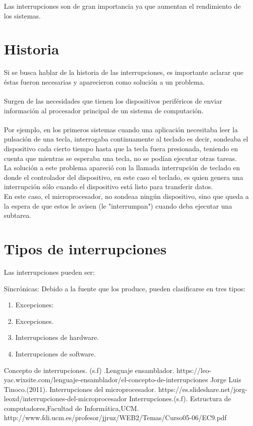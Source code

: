 \documentclass{report}   %
\begin{document}
Las interrupciones son de gran importancia ya que aumentan el rendimiento de los sistemas. 

\section*{Historia}
Si se busca hablar de la historia de las interrupciones, es importante aclarar que éstas fueron necesarias y aparecieron como solución a un problema.\\\\
Surgen de las necesidades que tienen los dispositivos periféricos de enviar información al procesador principal de un sistema de computación.\\\\ Por ejemplo, en los primeros sistemas cuando una aplicación necesitaba leer la pulsación de una tecla, interrogaba continuamente al teclado es decir, sondeaba el dispositivo cada cierto tiempo hasta que la tecla fuera presionada, teniendo en cuenta que mientras se esperaba una tecla, no se podían ejecutar otras tareas.\\ La solución a este problema apareció con la llamada interrupción de teclado en donde el controlador del dispositivo, en este caso el teclado, es quien genera una interrupción sólo cuando el dispositivo está listo para transferir datos.\\ En este caso, el microprocesador, no sondeaa ningún dispositivo, sino que queda a la espera de que estos le avisen (le "interrumpan") cuando deba ejecutar una subtarea.

\section*{Tipos de interrupciones}
Las interrupciones pueden ser:
\item Síncrónicas: 
Debido a la fuente que los produce, pueden clasificarse en tres tipos:
\begin{enumerate}
 \item Excepciones:


\item Excepciones.
\item Interrupciones de hardware.
\item Interrupciones de software.
\end{enumerate}


\begin{thebibliography}{0}
  Concepto de interrupciones. (s.f) .Lenguaje ensamblador.
  https://leo-yac.wixsite.com/lenguaje-ensamblador/el-concepto-de-interrupciones
   Jorge Luis Tinoco.(2011). Interrupciones del microprocesador. https://es.slideshare.net/jorg-leoxd/interrupciones-del-microprocesador
   Interrupciones.(s.f). Estructura de computadores,Facultad de Informática,UCM. http://www.fdi.ucm.es/profesor/jjruz/WEB2/Temas/Curso05-06/EC9.pdf
\end{thebibliography}
\end{document}
